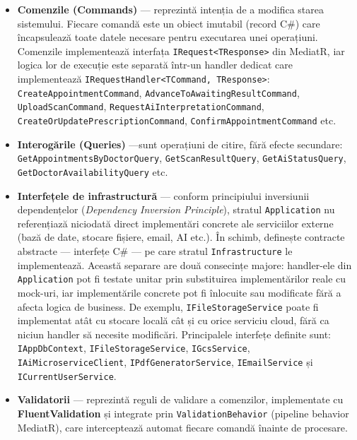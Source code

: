 \documentclass[12pt, a4paper]{report}
\begin{document}
\begin{itemize}

    \item \textbf{Comenzile (Commands)} --- reprezintă intenția de a modifica starea
          sistemului. Fiecare comandă este un obiect imutabil (record C\#) care
          încapsulează toate datele necesare pentru executarea unei operațiuni.
          Comenzile implementează interfața \texttt{IRequest<TResponse>} din MediatR,
          iar logica lor de execuție este separată într-un handler dedicat care
          implementează \texttt{IRequestHandler<TCommand, TResponse>}:
          \texttt{CreateAppointmentCommand}, \texttt{AdvanceToAwaitingResultCommand},
          \texttt{UploadScanCommand}, \texttt{RequestAiInterpretationCommand},
          \texttt{CreateOrUpdatePrescriptionCommand}, \texttt{ConfirmAppointmentCommand} etc.

    \item \textbf{Interogările (Queries)} ---sunt  operațiuni de citire, fără efecte secundare:
          \texttt{GetAppointmentsByDoctorQuery}, \texttt{GetScanResultQuery},
          \texttt{GetAiStatusQuery}, \texttt{GetDoctorAvailabilityQuery} etc.

    \item \textbf{Interfețele de infrastructură} --- conform principiului inversiunii
          dependențelor (\textit{Dependency Inversion Principle}), stratul
          \texttt{Application} nu referențiază niciodată direct implementări concrete
          ale serviciilor externe (bază de date, stocare fișiere, email, AI etc.).
          În schimb, definește contracte abstracte --- interfețe C\# --- pe care stratul
          \texttt{Infrastructure} le implementează. Această separare are două consecințe
          majore: handler-ele din \texttt{Application} pot fi testate unitar prin
          substituirea implementărilor reale cu mock-uri, iar implementările concrete
          pot fi înlocuite sau modificate fără a afecta logica de business.
          De exemplu, \texttt{IFileStorageService} poate fi implementat atât cu stocare
          locală cât și cu orice serviciu cloud, fără ca niciun handler să necesite
          modificări. Principalele interfețe definite sunt: \texttt{IAppDbContext},
          \texttt{IFileStorageService}, \texttt{IGcsService},
          \texttt{IAiMicroserviceClient}, \texttt{IPdfGeneratorService},
          \texttt{IEmailService} și \texttt{ICurrentUserService}.

    \item \textbf{Validatorii} --- reprezintă reguli de validare a comenzilor, implementate cu
          \textbf{FluentValidation} și integrate prin \texttt{ValidationBehavior}
          (pipeline behavior MediatR), care interceptează automat fiecare comandă
          înainte de procesare.

\end{itemize}
\end{document}
